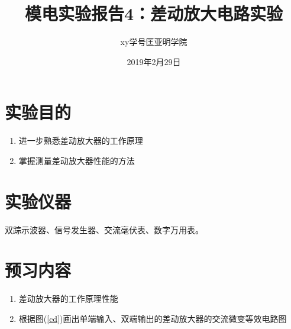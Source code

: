 \documentclass[a4paper]{article}
\title{模电实验报告4：差动放大电路实验}
\author{xy\quad 学号\quad 匡亚明学院}
\date{2019年2月29日}
\begin{document}
\maketitle


\section{实验目的}
\begin{enumerate}
\item 进一步熟悉差动放大器的工作原理
\item 掌握测量差动放大器性能的方法
\end{enumerate}

\section{实验仪器}
双踪示波器、信号发生器、交流毫伏表、数字万用表。

\section{预习内容}
\begin{enumerate}
\item 差动放大器的工作原理性能
\item 根据图(\ref{cd})画出单端输入、双端输出的差动放大器的交流微变等效电路图
\end{enumerate}
\end{document}
